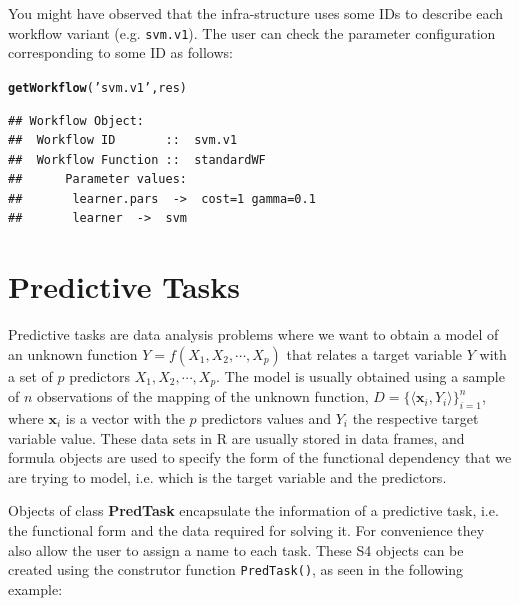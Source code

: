 \documentclass[10pt,a4paper]{article}\usepackage[]{graphicx}\usepackage[]{color}
\makeatletter
\newcommand{\hlstr}[1]{\textcolor[rgb]{0.192,0.494,0.8}{#1}}%
\newcommand{\hlstd}[1]{\textcolor[rgb]{0.345,0.345,0.345}{#1}}%
\newcommand{\hlkwd}[1]{\textcolor[rgb]{0.737,0.353,0.396}{\textbf{#1}}}%
\newenvironment{kframe}{%
 \def\at@end@of@kframe{}%
 \ifinner\ifhmode%
  \def\at@end@of@kframe{\end{minipage}}%
  \begin{minipage}{\columnwidth}%
 \fi\fi%
 \def\FrameCommand##1{\hskip\@totalleftmargin \hskip-\fboxsep
 \colorbox{shadecolor}{##1}\hskip-\fboxsep
     \hskip-\linewidth \hskip-\@totalleftmargin \hskip\columnwidth}%
 \MakeFramed {\advance\hsize-\width
   \@totalleftmargin\z@ \linewidth\hsize
   \@setminipage}}%
 {\par\unskip\endMakeFramed%
 \at@end@of@kframe}
\newenvironment{knitrout}{}{} %
\makeatother
\begin{document}
You might have observed that the infra-structure uses some IDs to
describe each workflow variant (e.g. \texttt{svm.v1}). The user can check
the parameter configuration corresponding to some ID as follows:

\begin{knitrout}
\color{fgcolor}\begin{kframe}
\begin{alltt}
\hlkwd{getWorkflow}\hlstd{(}\hlstr{'svm.v1'}\hlstd{,res)}
\end{alltt}
\begin{verbatim}
## Workflow Object:
## 	Workflow ID       ::  svm.v1 
## 	Workflow Function ::  standardWF
## 		Parameter values:
## 		 learner.pars  ->  cost=1 gamma=0.1 
## 		 learner  ->  svm
\end{verbatim}
\end{kframe}
\end{knitrout}


\section{Predictive Tasks}

Predictive tasks are data analysis problems where we want to obtain a
model of an unknown function $Y=f(X_1, X_2, \cdots, X_p)$ that relates
a target variable $Y$ with a set of $p$ predictors $X_1, X_2, \cdots,
X_p$. The model is usually obtained using a sample of $n$ observations
of the mapping of the unknown function, $D=\{\langle \mathbf{x}_i,
Y_i\rangle\}_{i=1}^n$, where $\mathbf{x}_i$ is a vector with the $p$
predictors values and $Y_i$ the respective target variable value.  These data sets in R are usually stored in data
frames, and formula objects are used to specify the form of the
functional dependency that we are trying to model, i.e. which is the
target variable and the predictors.

Objects of class \textbf{PredTask} encapsulate the information of a
predictive task, i.e. the functional form and the data required for
solving it. For convenience they also allow the user to assign a name
to each task. These S4 objects can be created using the construtor
function \texttt{PredTask()}, as seen in the following example:
\end{document}
